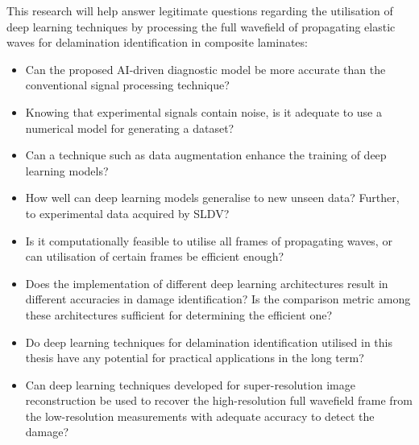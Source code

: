 This research will help answer legitimate questions regarding the utilisation of deep learning techniques by processing the full wavefield of propagating elastic waves for delamination identification in composite laminates:
\begin{itemize}
	\item Can the proposed AI-driven diagnostic model be more accurate than the conven\-tional signal processing technique?
	\item Knowing that experimental signals contain noise, is it adequate to use a numerical model for generating a dataset?
	\item Can a technique such as data augmentation enhance the training of deep learning models?
	\item How well can deep learning models generalise to new unseen data? Further, to experimental data acquired by SLDV?
	\item Is it computationally feasible to utilise all frames of propagating waves, or can utilisation of certain frames be efficient enough?
	\item Does the implementation of different deep learning architectures result in different accuracies in damage identification? Is the comparison metric among these architectures sufficient for determining the efficient one?
	\item Do deep learning techniques for delamination identification utilised in this thesis have any potential for practical applications in the long term?
	\item Can deep learning techniques developed for super-resolution image reconstruction be used to recover the high-resolution full wavefield frame from the low-resolution measurements with adequate accuracy to detect the damage?
\end{itemize}
